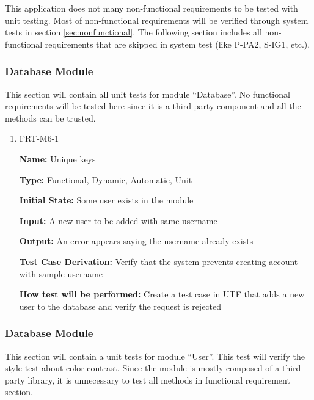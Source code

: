 \documentclass[12pt, titlepage]{article}
\begin{document}
This application does not many non-functional requirements to be tested with unit testing.  Most of non-functional requirements will be verified through system tests in section \ref{sec:nonfunctional}. The following section includes all non-functional requirements that are skipped in system test (like P-PA2, S-IG1, etc.).

\subsubsection{Database Module}

This section will contain all unit tests for module ``Database''.  No functional requirements will be tested here since it is a third party component and all the methods can be trusted. 

\begin{enumerate}
\item{FRT-M6-1}

\textbf{Name:} Unique keys

\textbf{Type:} Functional, Dynamic, Automatic, Unit
					
\textbf{Initial State:} Some user exists in the module
					
\textbf{Input:} A new user to be added with same username
					
\textbf{Output:} An error appears saying the username already exists

\textbf{Test Case Derivation:} Verify that the system prevents creating account with sample username

\textbf{How test will be performed:} Create a test case in UTF that adds a new user to the database and verify the request is rejected
\end{enumerate}

\subsubsection{Database Module}

This section will contain a unit tests for module ``User''.  This test will verify the style test about color contrast. Since the module is mostly composed of a third party library, it is unnecessary to test all methods in functional requirement section.
\end{document}
